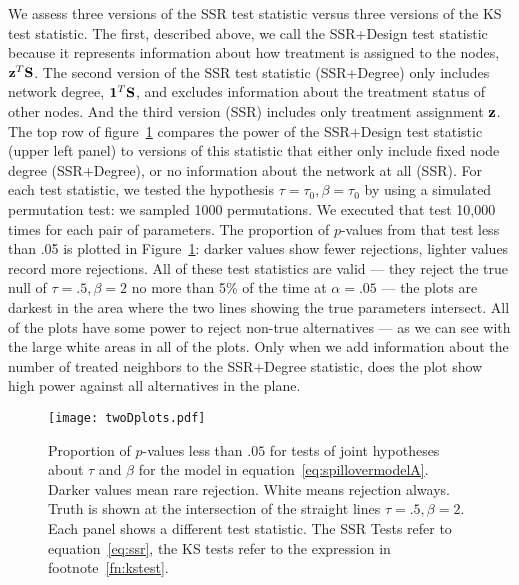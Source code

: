 We assess three versions of the SSR test statistic versus three versions of
the KS test statistic. The first, described above, we call the SSR+Design test
statistic because it represents information about how treatment is assigned to
the nodes, $\mathbf{z}^T \mathbf{S}$. The second version of
the SSR test statistic (SSR+Degree) only includes network degree,  $\mathbf{1}^T \mathbf{S}$, and
excludes information about the treatment status of other nodes. And the
third version (SSR) includes only treatment assignment $\mathbf{z}$. The top row of
figure~\ref{fig:twoD} compares the power of the SSR+Design test statistic
(upper left panel) to versions of this statistic that either only include
fixed node degree (SSR+Degree), or no information about the network at all
(SSR). For each test statistic, we tested the hypothesis
$\tau=\tau_0,\beta=\tau_0$ by using a simulated permutation test: we
sampled 1000 permutations. We executed that test
10,000 times for each pair of parameters.  The proportion of $p$-values from
that test less than .05 is plotted in Figure~\ref{fig:twoD}: darker values
show fewer rejections, lighter values record more rejections.  All of these
test statistics are valid --- they reject the true null of $\tau=.5,\beta=2$
no more than 5\% of the time at $\alpha=.05$ --- the plots are darkest in the
area where the two lines showing the true parameters intersect. All of the
plots have some power to reject non-true alternatives --- as we can see with
the large white areas in all of the plots. Only when we add
information about the number of treated neighbors to the SSR+Degree statistic,
does the plot show high power against all alternatives in the plane.


\begin{figure}[h!] \centering
  \texttt{[image: twoDplots.pdf]} \caption{Proportion of
    $p$-values less than $.05$ for tests of joint hypotheses about $\tau$ and
    $\beta$ for the model in equation~\ref{eq:spillovermodelA}. Darker values
    mean rare rejection. White means rejection always. Truth is shown at the
    intersection of the straight lines  $\tau=.5, \beta=2$. Each panel shows a
    different test statistic. The SSR Tests refer to equation~\ref{eq:ssr},
    the KS tests refer to the expression in
    footnote~\ref{fn:kstest}.}\label{fig:twoD}
\end{figure}


